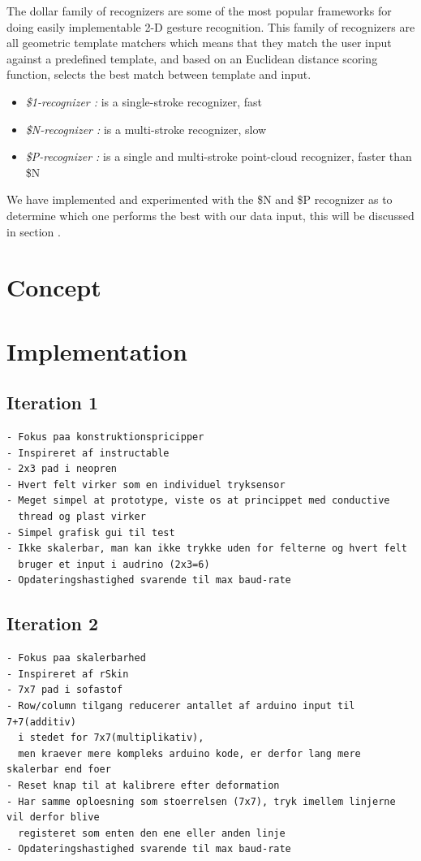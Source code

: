 
The dollar family of recognizers \citep{anthony2010lightweight,vatavu2012gestures,wobbrock2007gestures} are some of the most popular frameworks for doing easily implementable 2-D gesture recognition.
This family of recognizers are all geometric template matchers which means that they match the user input against a predefined template, and based on an Euclidean distance scoring function, selects the best match between template and input.
\begin{itemize}
  \item \emph{\$1-recognizer \citep{wobbrock2007gestures}:} is a single-stroke recognizer, fast
  \item \emph{\$N-recognizer \citep{anthony2010lightweight}:} is a multi-stroke recognizer, slow
  \item \emph{\$P-recognizer \citep{vatavu2012gestures}:} is a single and multi-stroke point-cloud recognizer, faster than \$N
\end{itemize}
We have implemented and experimented with the \$N and \$P recognizer as to determine which one performs the best with our data input, this will be discussed in section .


\section{Concept}

\section{Implementation}
\subsection{Iteration 1}
\begin{verbatim}
- Fokus paa konstruktionspricipper
- Inspireret af instructable
- 2x3 pad i neopren
- Hvert felt virker som en individuel tryksensor
- Meget simpel at prototype, viste os at princippet med conductive 
  thread og plast virker
- Simpel grafisk gui til test
- Ikke skalerbar, man kan ikke trykke uden for felterne og hvert felt
  bruger et input i audrino (2x3=6)
- Opdateringshastighed svarende til max baud-rate
\end{verbatim}
\subsection{Iteration 2}
\begin{verbatim}
- Fokus paa skalerbarhed
- Inspireret af rSkin
- 7x7 pad i sofastof
- Row/column tilgang reducerer antallet af arduino input til 7+7(additiv)
  i stedet for 7x7(multiplikativ),
  men kraever mere kompleks arduino kode, er derfor lang mere skalerbar end foer
- Reset knap til at kalibrere efter deformation
- Har samme oploesning som stoerrelsen (7x7), tryk imellem linjerne vil derfor blive 
  registeret som enten den ene eller anden linje
- Opdateringshastighed svarende til max baud-rate
\end{verbatim}

